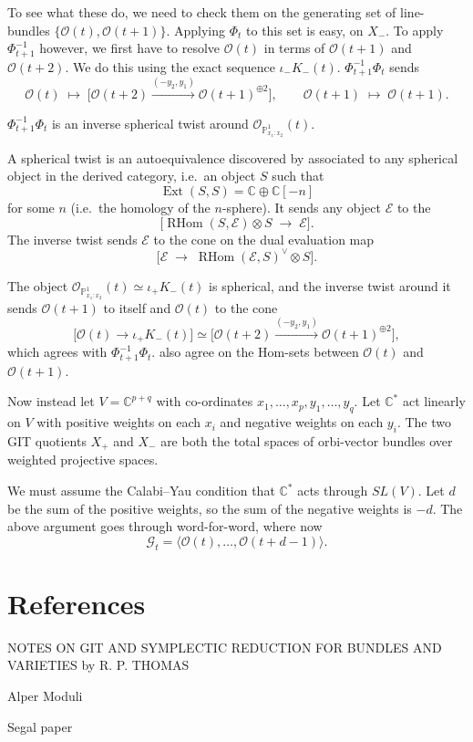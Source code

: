 \documentclass[12pt]{article}
\begin{document}
To see what these do, we need to check them on the generating set of line-bundles 
$\{\mathcal{O}(t), \mathcal{O}(t+1)\}$. Applying $\Phi_t$ to this set is easy,  on $X_-$. To apply $\Phi_{t+1}^{-1}$ however, we first have to resolve 
$\mathcal{O}(t)$ in terms of $\mathcal{O}(t+1)$ and $\mathcal{O}(t+2)$. We do this using the 
exact sequence $\iota_-K_{-}(t)$. $\Phi_{t+1}^{-1}\Phi_t$ sends
\[
\mathcal{O}(t) \;\mapsto\; 
\big[ \mathcal{O}(t+2) \xrightarrow{(-y_2,y_1)} \mathcal{O}(t+1)^{\oplus 2} \big], 
\qquad
\mathcal{O}(t+1) \;\mapsto\; \mathcal{O}(t+1).
\]

\begin{claim}
$\Phi_{t+1}^{-1}\Phi_t$ is an inverse spherical twist around 
$\mathcal{O}_{\mathbb{P}^1_{x_1:x_2}}(t)$.
\end{claim}

A spherical twist is an autoequivalence discovered by \cite{seidel-thomas} associated to any 
spherical object in the derived category, i.e.\ an object $S$ such that
\[
\operatorname{Ext}(S,S) = \mathbb{C} \oplus \mathbb{C}[-n]
\]
for some $n$ (i.e.\ the homology of the $n$-sphere). It sends any object $\mathcal{E}$ to the 
\[
\big[ \operatorname{RHom}(S,\mathcal{E}) \otimes S \;\longrightarrow\; \mathcal{E} \big].
\]
The inverse twist sends $\mathcal{E}$ to the cone on the dual evaluation map
\[
\big[ \mathcal{E} \;\longrightarrow\; \operatorname{RHom}(\mathcal{E},S)^\vee \otimes S \big].
\]

The object $\mathcal{O}_{\mathbb{P}^1_{x_1:x_2}}(t) \simeq \iota_+K_{-}(t)$ is spherical, and 
the inverse twist around it sends $\mathcal{O}(t+1)$ to itself and $\mathcal{O}(t)$ to the cone
\[
\big[\mathcal{O}(t) \longrightarrow \iota_+K_{-}(t)\big] 
\simeq \big[\mathcal{O}(t+2) \xrightarrow{(-y_2,y_1)} \mathcal{O}(t+1)^{\oplus 2}\big],
\]
which agrees with $\Phi_{t+1}^{-1}\Phi_t$. also agree on the Hom-sets between $\mathcal{O}(t)$ and 
$\mathcal{O}(t+1)$.

Now instead let $V = \mathbb{C}^{p+q}$ with co-ordinates $x_1,\ldots,x_p, y_1,\ldots,y_q$. 
Let $\mathbb{C}^*$ act linearly on $V$ with positive weights on each $x_i$ and negative weights 
on each $y_i$. The two GIT quotients $X_+$ and $X_-$ are both the total spaces of orbi-vector 
bundles over weighted projective spaces.

We must assume the Calabi–Yau condition that $\mathbb{C}^*$ acts through $SL(V)$. Let $d$ be the 
sum of the positive weights, so the sum of the negative weights is $-d$. The above argument goes 
through word-for-word, where now
\[
\mathcal{G}_t = \langle \mathcal{O}(t), \ldots, \mathcal{O}(t+d-1)\rangle.
\]

\section{References}
NOTES ON GIT AND SYMPLECTIC REDUCTION FOR
BUNDLES AND VARIETIES
by R. P. THOMAS

Alper Moduli 

Segal paper
\end{document}

